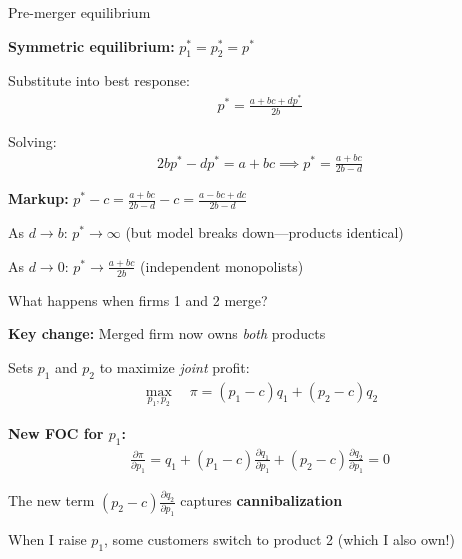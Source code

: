 \documentclass[notes,11pt, aspectratio=169]{beamer}
\newenvironment{wideitemize}{\itemize\addtolength{\itemsep}{10pt}}{\enditemize}
\begin{document}
\begin{frame}{Pre-merger equilibrium}
	\begin{wideitemize}
		\item \textbf{Symmetric equilibrium:} $p_1^* = p_2^* = p^*$
		\item Substitute into best response:
		\begin{align*}
			p^* = \frac{a + bc + dp^*}{2b}
		\end{align*}
		\item Solving:
		\begin{align*}
			2bp^* - dp^* = a + bc \implies p^* = \frac{a + bc}{2b - d}
		\end{align*}
		\item \textbf{Markup:} $p^* - c = \frac{a + bc}{2b - d} - c = \frac{a - bc + dc}{2b - d}$
		\item As $d \to b$: $p^* \to \infty$ (but model breaks down---products identical)
		\item As $d \to 0$: $p^* \to \frac{a + bc}{2b}$ (independent monopolists)
	\end{wideitemize}
\end{frame}

\begin{frame}{What happens when firms 1 and 2 merge?}
	\begin{wideitemize}
		\item \textbf{Key change:} Merged firm now owns \textit{both} products
		\item Sets $p_1$ and $p_2$ to maximize \textit{joint} profit:
		\begin{align*}
			\max_{p_1, p_2} \quad \pi = (p_1 - c)q_1 + (p_2 - c)q_2
		\end{align*}
		\item \textbf{New FOC for $p_1$:}
		\begin{align*}
			\frac{\partial \pi}{\partial p_1} = q_1 + (p_1 - c)\frac{\partial q_1}{\partial p_1} + (p_2 - c)\frac{\partial q_2}{\partial p_1} = 0
		\end{align*}
		\item The new term $(p_2 - c)\frac{\partial q_2}{\partial p_1}$ captures \textbf{cannibalization}
		\item When I raise $p_1$, some customers switch to product 2 (which I also own!)
	\end{wideitemize}
\end{frame}
\end{document}
